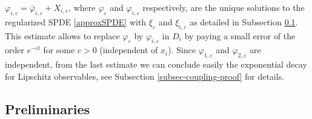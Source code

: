 \documentclass{article}
\begin{document}
$\varphi_{i, \varepsilon} = \bar{\varphi}_{i, \varepsilon} + X_{i,
\varepsilon}$, where ${\varphi}_{\varepsilon}$ and ${\varphi}_{i,
\varepsilon}$ respectively, are the unique solutions to the regularized SPDE
\eqref{approxSPDE} with $\xi_{\varepsilon}$ and $\xi_{i, \varepsilon}$ as detailed in Subsection \ref{subsec-coupling-notation}. This
estimate allows to replace $\varphi_{\varepsilon}$ by $\varphi_{i,
\varepsilon}$ in $D_i$ by paying a small error of the order $e^{- c l}$ for some $c>0$ (independent of $x_i$). Since
$\varphi_{1, \varepsilon}$ and $\varphi_{2, \varepsilon}$ are independent,
from the last estimate we can conclude easily the exponential decay for
Lipschitz observables, see Subsection \ref{subsec-coupling-proof} for details.

\subsection{Preliminaries}\label{subsec-coupling-notation}
\end{document}
